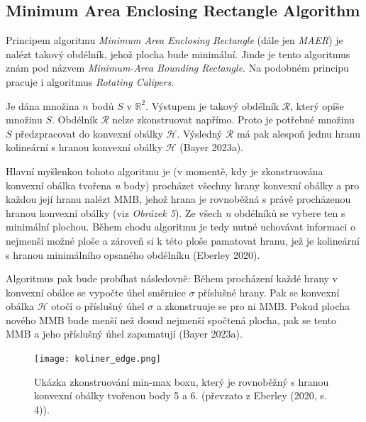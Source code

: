 \bigbreak

\subsection*{Minimum Area Enclosing Rectangle Algorithm}

\par Principem algoritmu \emph{Minimum Area Enclosing Rectangle} (dále jen \emph{MAER}) je nalézt takový obdélník, jehož plocha bude minimální. Jinde je tento algoritmus znám pod názvem \emph{Minimum-Area Bounding Rectangle}. Na podobném principu pracuje i algoritmus \emph{Rotating Calipers}.

\par Je dána množina $n$ bodů $S$ v $\mathbb{R}^2$. Výstupem je takový obdélník $\mathcal{R}$, který opíše množinu $S$. Obdélník $\mathcal{R}$ nelze zkonstruovat napřímo. Proto je potřebné množinu $S$ předzpracovat do konvexní obálky $\mathcal{H}$. Výsledný $\mathcal{R}$ má pak alespoň jednu hranu kolineární s hranou konvexní obálky $\mathcal{H}$ (Bayer 2023a).

\par Hlavní myšlenkou tohoto algoritmu je (v momentě, kdy je zkonstruována konvexní obálka tvořena \emph{n} body) procházet všechny hrany konvexní obálky a pro každou její hranu nalézt MMB, jehož hrana je rovnoběžná s právě procházenou hranou konvexní obálky (viz \emph{Obrázek 5}). Ze všech \emph{n} obdélníků se vybere ten s minimální plochou. Během chodu algoritmu je tedy nutné uchovávat informaci o nejmenší možné ploše a zároveň si k této ploše pamatovat hranu, jež je kolineární s hranou minimálního opsaného obdélníku (Eberley 2020).

\par Algoritmus pak bude probíhat následovně: Během procházení každé hrany v konvexní obálce se vypočte úhel směrnice $\sigma$ příslušné hrany. Pak se konvexní obálka $\mathcal{H}$ otočí o příslušný úhel $\sigma$ a zkonstruuje se pro ni MMB. Pokud plocha nového MMB bude menší než dosud nejmenší spočtená plocha, pak se tento MMB a jeho příslušný úhel zapamatují (Bayer 2023a).

\begin{figure}[h]
\centering
\texttt{[image: koliner\_edge.png]} 
    \caption{Ukázka zkonstruování min-max boxu, který je rovnoběžný s hranou konvexní obálky tvořenou body 5 a 6. (převzato z Eberley (2020, s. 4)).}
\end{figure}
\newpage

